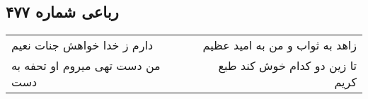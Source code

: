 \begin{center}
\section*{رباعی شماره ۴۷۷}
\label{sec:sh477}
\begin{longtable}{l p{0.5cm} r}
دارم ز خدا خواهش جنات نعیم
&&
زاهد به ثواب و من به امید عظیم
\\
من دست تهی میروم او تحفه به دست
&&
تا زین دو کدام خوش کند طبع کریم
\\
\end{longtable}
\end{center}
